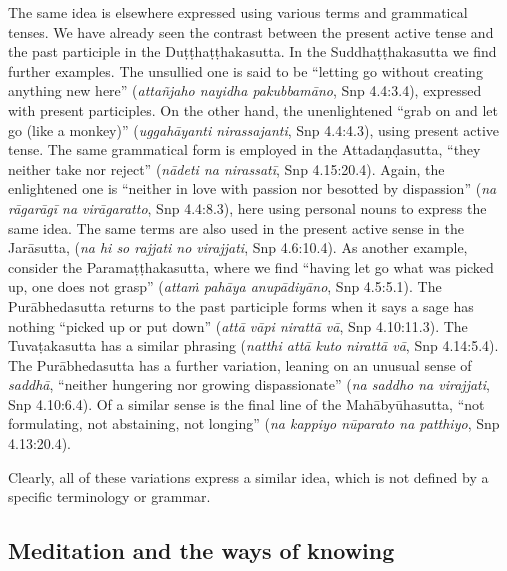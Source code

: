 \documentclass[12pt,openany]{book}%
\begin{document}
The same idea is elsewhere expressed using various terms and grammatical tenses. We have already seen the contrast between the present active tense and the past participle in the \textsanskrit{Duṭṭhaṭṭhakasutta}. In the \textsanskrit{Suddhaṭṭhakasutta} we find further examples. The unsullied one is said to be “letting go without creating anything new here” (\textit{\textsanskrit{attañjaho} nayidha \textsanskrit{pakubbamāno}}, Snp 4.4:3.4), expressed with present participles. On the other hand, the unenlightened “grab on and let go (like a monkey)” (\textit{\textsanskrit{uggahāyanti} nirassajanti}, Snp 4.4:4.3), using present active tense. The same grammatical form is employed in the \textsanskrit{Attadaṇḍasutta}, “they neither take nor reject” (\textit{\textsanskrit{nādeti} na \textsanskrit{nirassatī}}, Snp 4.15:20.4). Again, the enlightened one is “neither in love with passion nor besotted by dispassion” (\textit{na \textsanskrit{rāgarāgī} na \textsanskrit{virāgaratto}}, Snp 4.4:8.3), here using personal nouns to express the same idea. The same terms are also used in the present active sense in the \textsanskrit{Jarāsutta}, (\textit{na hi so rajjati no virajjati}, Snp 4.6:10.4). As another example, consider the \textsanskrit{Paramaṭṭhakasutta}, where we find “having let go what was picked up, one does not grasp” (\textit{\textsanskrit{attaṁ} \textsanskrit{pahāya} \textsanskrit{anupādiyāno}}, Snp 4.5:5.1). The \textsanskrit{Purābhedasutta} returns to the past participle forms when it says a sage has nothing “picked up or put down” (\textit{\textsanskrit{attā} \textsanskrit{vāpi} \textsanskrit{nirattā} \textsanskrit{vā}}, Snp 4.10:11.3). The \textsanskrit{Tuvaṭakasutta} has a similar phrasing (\textit{natthi \textsanskrit{attā} kuto \textsanskrit{nirattā} \textsanskrit{vā}}, Snp 4.14:5.4). The \textsanskrit{Purābhedasutta} has a further variation, leaning on an unusual sense of \textit{\textsanskrit{saddhā}}, “neither hungering nor growing dispassionate” (\textit{na saddho na virajjati}, Snp 4.10:6.4). Of a similar sense is the final line of the \textsanskrit{Mahābyūhasutta}, “not formulating, not abstaining, not longing” (\textit{na kappiyo \textsanskrit{nūparato} na patthiyo}, Snp 4.13:20.4).

Clearly, all of these variations express a similar idea, which is not defined by a specific terminology or grammar.

\subsection*{Meditation and the ways of knowing}
\end{document}
